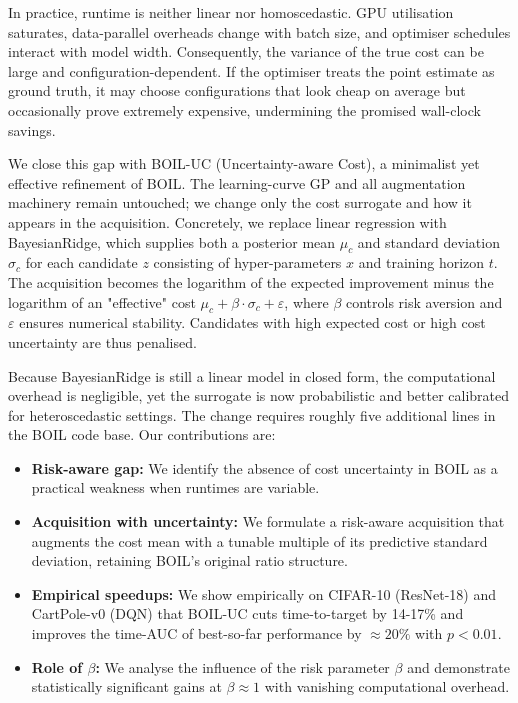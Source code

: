 \documentclass{article} %
\begin{document}
In practice, runtime is neither linear nor homoscedastic. GPU utilisation saturates, data-parallel overheads change with batch size, and optimiser schedules interact with model width. Consequently, the variance of the true cost can be large and configuration-dependent. If the optimiser treats the point estimate as ground truth, it may choose configurations that look cheap on average but occasionally prove extremely expensive, undermining the promised wall-clock savings.

We close this gap with BOIL-UC (Uncertainty-aware Cost), a minimalist yet effective refinement of BOIL. The learning-curve GP and all augmentation machinery remain untouched; we change only the cost surrogate and how it appears in the acquisition. Concretely, we replace linear regression with BayesianRidge, which supplies both a posterior mean $\mu_c$ and standard deviation $\sigma_c$ for each candidate $z$ consisting of hyper-parameters $x$ and training horizon $t$. The acquisition becomes the logarithm of the expected improvement minus the logarithm of an "effective" cost $\mu_c + \beta\cdot\sigma_c + \varepsilon$, where $\beta$ controls risk aversion and $\varepsilon$ ensures numerical stability. Candidates with high expected cost or high cost uncertainty are thus penalised.

Because BayesianRidge is still a linear model in closed form, the computational overhead is negligible, yet the surrogate is now probabilistic and better calibrated for heteroscedastic settings. The change requires roughly five additional lines in the BOIL code base. Our contributions are:
\begin{itemize}
\item \textbf{Risk-aware gap:} We identify the absence of cost uncertainty in BOIL as a practical weakness when runtimes are variable.
\item \textbf{Acquisition with uncertainty:} We formulate a risk-aware acquisition that augments the cost mean with a tunable multiple of its predictive standard deviation, retaining BOIL’s original ratio structure.
\item \textbf{Empirical speedups:} We show empirically on CIFAR-10 (ResNet-18) and CartPole-v0 (DQN) that BOIL-UC cuts time-to-target by 14-17\% and improves the time-AUC of best-so-far performance by $\approx 20\%$ with $p<0.01$.
\item \textbf{Role of $\beta$:} We analyse the influence of the risk parameter $\beta$ and demonstrate statistically significant gains at $\beta\approx 1$ with vanishing computational overhead.
\end{itemize}
\end{document}
